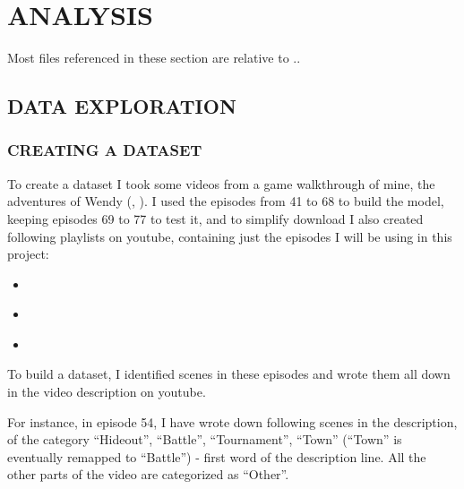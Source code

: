\documentclass[
]{article}
\providecommand{\tightlist}{%
  \setlength{\itemsep}{0pt}\setlength{\parskip}{0pt}}
\newcommand{\hhref}[3][blue]{\href{#2}{\color{#1}{#3}}}%
\begin{document}
\hypertarget{analysis}{%
\section{ANALYSIS}\label{analysis}}

Most files referenced in these section are relative to \hhref{https://github.com/diegoami/DA_ML_Capstone/}{this Github repository}..


\hypertarget{data-exploration}{%
\subsection{DATA EXPLORATION}\label{data-exploration}}

\hypertarget{creating-a-dataset}{%
\subsubsection{CREATING A DATASET}\label{creating-a-dataset}}

To create a dataset I took some videos from a game walkthrough of mine,
the adventures of Wendy (\hhref{https://www.youtube.com/playlist?list=PLNP_nRm4k4jfNLo7FkjXewFH9Xe5Uc2Pa}{I}, \hhref{https://www.youtube.com/playlist?list=PLNP_nRm4k4jd-AJ0GwTPS1ld2YP8FdT4h}{II}). 
I used the episodes from 41 to 68 to build the model, keeping episodes 69 to 77 to test it, and to simplify download I also created following playlists on youtube, containing just the episodes I will be using in this project:

\begin{itemize}
\tightlist
\item
  \hhref{https://www.youtube.com/playlist?list=PLNP_nRm4k4jfVfQobYTRQAXV\_uOzt8Bov}{CNN-Wendy-I}
\item
  \hhref{https://www.youtube.com/playlist?list=PLNP_nRm4k4jdEQ-OM31xNqeE64svvx-aT}{CNN-Wendy-II}
\item
  \hhref{https://www.youtube.com/playlist?list=PLNP_nRm4k4jeoJ8H7mtTUbbOJ6_Rx_god}{CNN-Wendy-III}
\end{itemize}

To build a dataset, I identified scenes in these episodes and wrote them all down in the video description on youtube. 

For instance, in episode 54, I have wrote down following scenes in the description, of the
category ``Hideout'', ``Battle'', ``Tournament'', ``Town'' (``Town'' is
eventually remapped to ``Battle'') - first word of the description line. All the other parts of the video are
categorized as ``Other''.   
\end{document}
